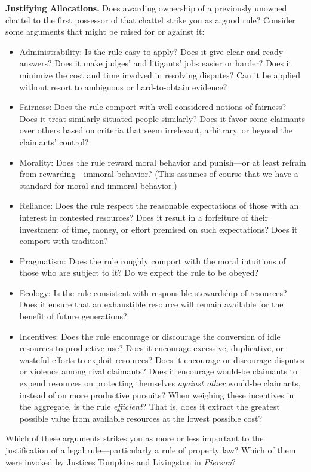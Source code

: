 
\item \label{bkm:Ref302293175}\textbf{Justifying Allocations.} Does awarding
ownership of a previously unowned chattel to the first possessor of that chattel
strike you as a good rule? Consider some arguments that might be raised for or
against it:
\begin{itemize}
\item Administrability: Is the rule easy to apply? Does it give clear and ready
answers? Does it make judges' and litigants' jobs easier or harder? Does it
minimize the cost and time involved in resolving disputes? Can it be applied
without resort to ambiguous or hard-to-obtain evidence?
\item Fairness: Does the rule comport with well-considered notions of fairness?
Does it treat similarly situated people similarly? Does it favor some claimants
over others based on criteria that seem irrelevant, arbitrary, or beyond the
claimants' control?
\item Morality: Does the rule reward moral behavior and punish---or at least
refrain from rewarding---immoral behavior? (This assumes of course that we have
a standard for moral and immoral behavior.)
\item Reliance: Does the rule respect the reasonable expectations of those with
an interest in contested resources? Does it result in a forfeiture of their
investment of time, money, or effort premised on such expectations? Does it
comport with tradition?
\item Pragmatism: Does the rule roughly comport with the moral intuitions of
those who are subject to it? Do we expect the rule to be obeyed?
\item Ecology: Is the rule consistent with responsible stewardship of resources?
Does it ensure that an exhaustible resource will remain available for the
benefit of future generations?
\item Incentives: Does the rule encourage or discourage the conversion of idle
resources to productive use? Does it encourage excessive, duplicative, or
wasteful efforts to exploit resources? Does it encourage or discourage disputes
or violence among rival claimants? Does it encourage would-be claimants to
expend resources on protecting themselves \textit{against other} would-be
claimants, instead of on more productive pursuits? When weighing these
incentives in the aggregate, is the rule \textit{efficient}? That is, does it
extract the greatest possible value from available resources at the lowest
possible cost?
\end{itemize}
Which of these arguments strikes you as more or less important to the
justification of a legal rule---particularly a rule of property law? Which of
them were invoked by Justices Tompkins and Livingston in \textit{Pierson}? 


